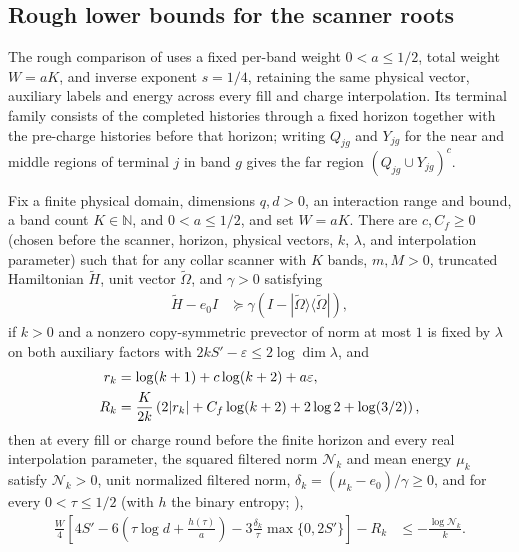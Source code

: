 \subsection{Rough lower bounds for the scanner roots}
\label{sec:actual_scan_rough_lower}

The rough comparison of \cite{OpenAI2026AreaLaw} uses a fixed per-band
weight $0<a\leq1/2$, total weight $W=aK$, and inverse exponent $s=1/4$,
retaining the same physical vector, auxiliary labels and energy across
every fill and charge interpolation.
Its terminal family consists of the completed histories through a fixed
horizon together with the pre-charge histories before that horizon;
writing $Q_{jg}$ and $Y_{jg}$ for the near and middle regions of terminal
$j$ in band $g$ gives the far region $(Q_{jg}\cup Y_{jg})^c$.

\begin{lemma}
    \label{thm:actual_scan_rough_lower_weight}
    \leanok
    Fix a finite physical domain, dimensions $q,d>0$, an interaction range and
    bound, a band count $K\in\mathbb N$, and $0<a\leq1/2$, and set $W=aK$.
    There are $c,C_f\geq0$ (chosen before the scanner, horizon, physical
    vectors, $k$, $\lambda$, and interpolation parameter) such that for any
    collar scanner with $K$ bands, $m,M>0$, truncated Hamiltonian
    $\widetilde H$, unit vector $\widetilde\Omega$, and $\gamma>0$ satisfying
    \begin{align}
        \widetilde H-e_0I
         & \succeq\gamma
        (I-|\widetilde\Omega\rangle\langle\widetilde\Omega|),
        \label{eq:actual_rough_weight_gap}
    \end{align}
    if $k>0$ and a nonzero copy-symmetric prevector of norm at most $1$ is
    fixed by $\lambda$ on both auxiliary factors with
    $2kS'-\varepsilon\leq2\log\dim\lambda$, and
    \begin{align}
        r_k & =\log(k+1)+c\log(k+2)+a\varepsilon,\notag \\
        R_k & =\frac{K}{2k}
        \left(2|r_k|+C_f\log(k+2)+2\log2+\log(3/2)\right),
        \label{eq:actual_rough_weight_remainder}
    \end{align}
    then at every fill or charge round before the finite horizon and every real
    interpolation parameter, the squared filtered norm $\mathcal N_k$ and mean
    energy $\mu_k$ satisfy $\mathcal N_k>0$, unit normalized filtered norm,
    $\delta_k=(\mu_k-e_0)/\gamma\geq0$, and for every $0<\tau\leq1/2$ (with $h$
    the binary entropy; \cite[Section~8, lines~97--169 and~585--651]{OpenAI2026AreaLaw}),
    \begin{align}
        \frac W4\left[
            4S'-6\left(\tau\log d+\frac{h(\tau)}a\right)
            -3\frac{\delta_k}{\tau}\max\{0,2S'\}\right]-R_k
         & \leq-\frac{\log\mathcal N_k}{k}.
        \label{eq:actual_rough_weight_rate}
    \end{align}
\end{lemma}
